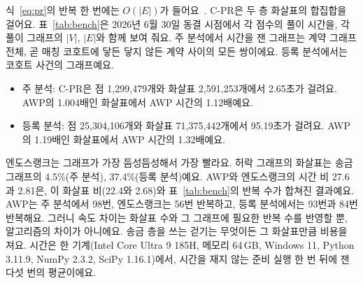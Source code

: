 식~\eqref{eq:pr}의 반복 한 번에는 $O(|E|)$가 들어요~\cite{leskovec2020mining}. C-PR은 두 층 화살표의 합집합을 걸어요. 표~\ref{tab:bench}은 2026년 6월 30일 동결 시점에서 각 점수의 풀이 시간을, 각 풀이 그래프의 $|V|$, $|E|$와 함께 보여 줘요. 주 분석에서 시간을 잰 그래프는 계약 그래프 전체, 곧 매칭 코호트에 닿든 닿지 않든 계약 사이의 모든 쌍이에요. 등록 분석에서는 코호트 사건의 그래프예요.
\begin{itemize}
\item 주 분석: C-PR은 점 1,299,479개와 화살표 2,591,253개에서 2.65초가 걸려요. AWP의 1.004배인 화살표에서 AWP 시간의 1.12배예요.
\item 등록 분석: 점 25,304,106개와 화살표 71,375,442개에서 95.19초가 걸려요. AWP의 1.19배인 화살표에서 AWP 시간의 1.32배예요.
\end{itemize}
엔도스랭크는 그래프가 가장 듬성듬성해서 가장 빨라요. 허락 그래프의 화살표는 송금 그래프의 4.5\%(주 분석), 37.4\%(등록 분석)예요. AWP와 엔도스랭크의 시간 비 27.6과 2.81은, 이 화살표 비(22.4와 2.68)와 표~\ref{tab:bench}의 반복 수가 합쳐진 결과예요. AWP는 주 분석에서 98번, 엔도스랭크는 56번 반복하고, 등록 분석에서는 93번과 84번 반복해요. 그러니 속도 차이는 화살표 수와 그 그래프에 필요한 반복 수를 반영할 뿐, 알고리즘의 차이가 아니에요. 송금 층을 쓰는 걷기는 무엇이든 그 화살표만큼 비용을 져요. 시간은 한 기계(Intel Core Ultra 9 185H, 메모리 64\,GB, Windows 11, Python 3.11.9, NumPy 2.3.2, SciPy 1.16.1)에서, 시간을 재지 않는 준비 실행 한 번 뒤에 잰 다섯 번의 평균이에요.

